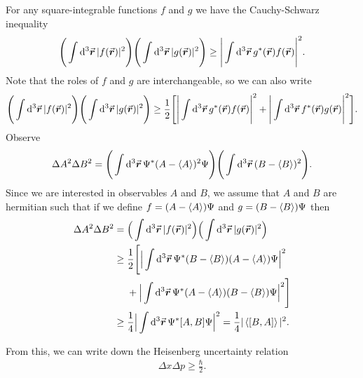 For any square-integrable functions $f$ and $g$ we have the Cauchy-Schwarz inequality
\begin{eqnarray}
    \Bigg( \int \dd[3]{\va*{r}} |f(\va*{r})|^2 \Bigg) \Bigg( \int \dd[3]{\va*{r}} |g(\va*{r})|^2 \Bigg) \geq \Bigg| \int \dd[3]{\va*{r}} g^{*}(\va*{r}) f(\va*{r}) \Bigg|^2
.\end{eqnarray}
Note that the roles of $f$ and $g$ are interchangeable, so we can also write
\begin{eqnarray} 
    \Bigg( \int \dd[3]{\va*{r}} |f(\va*{r})|^2 \Bigg) \Bigg( \int \dd[3]{\va*{r}} |g(\va*{r})|^2 \Bigg) \geq \frac{1}{2} \Bigg[ \Bigg| \int \dd[3]{\va*{r}} g^{*}(\va*{r}) f(\va*{r}) \Bigg|^2 + \Bigg| \int \dd[3]{\va*{r}} f^{*}(\va*{r}) g(\va*{r}) \Bigg|^2 \Bigg]
.\end{eqnarray}
Observe
\begin{eqnarray}
    \Delta A^2 \Delta B^2 = \Bigg( \int \dd[3]{\va*{r}} \Psi^{*} (A - \expval{A})^2 \Psi \Bigg) \Bigg( \int \dd[3]{\va*{r}} (B - \expval{B})^2 \Bigg)
.\end{eqnarray}
Since we are interested in observables $A$ and $B$, we assume that $A$ and $B$ are hermitian such that if we define $f = (A - \expval{A}) \Psi$ and $g = (B - \expval{B}) \Psi$ then 
\begin{eqnarray}
    \begin{aligned}
        \Delta A^2 \Delta B^2 &= \Big( \int \dd[3]{\va*{r}} |f(\va*{r})|^2 \Big) \Big( \int \dd[3]{\va*{r}} |g(\va*{r})|^2 \Big) \\
                              &\geq \frac{1}{2} \Bigg[ \Big| \int \dd[3]{\va*{r}} \Psi^{*} (B - \expval{B})(A - \expval{A}) \Psi \Big|^2 \\
                              &\phantom{\frac{1}{2} \Bigg[ } + \Big| \int \dd[3]{\va*{r}} \Psi^{*} (A - \expval{A})(B - \expval{B}) \Psi \Big|^2 \Bigg] \\
                              &\geq \frac{1}{4} \Big| \int \dd[3]{\va*{r}} \Psi^{*} [A,B] \Psi \Big|^2 = \frac{1}{4} |\expval{[B,A]}|^2
    .\end{aligned}
\end{eqnarray}

From this, we can write down the Heisenberg uncertainty relation
\begin{eqnarray}
    \Delta x \Delta p \geq \frac{\hbar}{2}
.\end{eqnarray}








